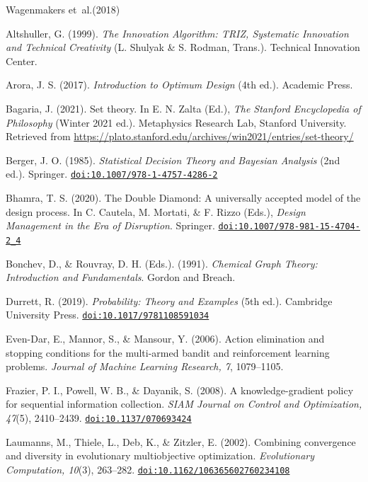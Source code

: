 \documentclass[11pt]{article}
\providecommand{\doi}[1]{\href{https://doi.org/#1}{\nolinkurl{doi:#1}}}
\begin{document}
\begin{thebibliography}{Wagenmakers et~al.(2018)}

 Altshuller, G. (1999). \textit{The Innovation Algorithm: TRIZ, Systematic Innovation and Technical Creativity} (L. Shulyak \& S. Rodman, Trans.). Technical Innovation Center.

 Arora, J. S. (2017). \textit{Introduction to Optimum Design} (4th ed.). Academic Press.

 Bagaria, J. (2021). Set theory. In E. N. Zalta (Ed.), \textit{The Stanford Encyclopedia of Philosophy} (Winter 2021 ed.). Metaphysics Research Lab, Stanford University. Retrieved from \url{https://plato.stanford.edu/archives/win2021/entries/set-theory/}

 Berger, J. O. (1985). \textit{Statistical Decision Theory and Bayesian Analysis} (2nd ed.). Springer. \doi{10.1007/978-1-4757-4286-2}

 Bhamra, T. S. (2020). The Double Diamond: A universally accepted model of the design process. In C. Cautela, M. Mortati, \& F. Rizzo (Eds.), \textit{Design Management in the Era of Disruption}. Springer. \doi{10.1007/978-981-15-4704-2_4}

 Bonchev, D., \& Rouvray, D. H. (Eds.). (1991). \textit{Chemical Graph Theory: Introduction and Fundamentals}. Gordon and Breach.

 Durrett, R. (2019). \textit{Probability: Theory and Examples} (5th ed.). Cambridge University Press. \doi{10.1017/9781108591034}

 Even-Dar, E., Mannor, S., \& Mansour, Y. (2006). Action elimination and stopping conditions for the multi-armed bandit and reinforcement learning problems. \textit{Journal of Machine Learning Research, 7}, 1079--1105.

 Frazier, P. I., Powell, W. B., \& Dayanik, S. (2008). A knowledge-gradient policy for sequential information collection. \textit{SIAM Journal on Control and Optimization, 47}(5), 2410--2439. \doi{10.1137/070693424}

 Laumanns, M., Thiele, L., Deb, K., \& Zitzler, E. (2002). Combining convergence and diversity in evolutionary multiobjective optimization. \textit{Evolutionary Computation, 10}(3), 263--282. \doi{10.1162/106365602760234108}


\end{thebibliography}
\end{document}

